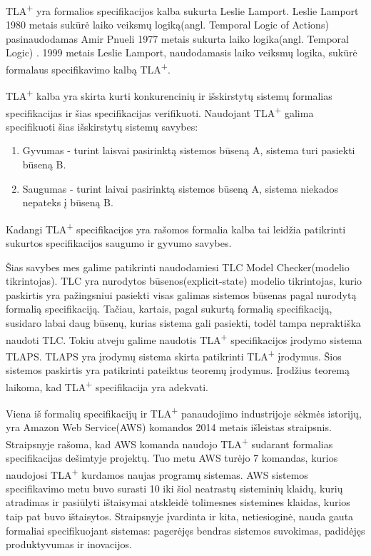 \documentclass{VUMIFPSmagistrinis}
\begin{document}
		TLA\textsuperscript{+} yra formalios specifikacijos kalba sukurta Leslie Lamport\cite{lamport2002specifying}.
		Leslie Lamport 1980 metais sukūrė laiko veiksmų logiką(angl. Temporal Logic of Actions)\cite{10.1145/177492.177726} pasinaudodamas Amir Pnueli 1977 metais sukurta laiko logika(angl. Temporal Logic) \cite{4567924}.
		1999 metais Leslie Lamport, naudodamasis laiko veiksmų logika, sukūrė formalaus specifikavimo kalbą TLA\textsuperscript{+}\cite{lamport2002specifying}.
		

TLA\textsuperscript{+} kalba yra skirta kurti konkurencinių ir išskirstytų sistemų formalias specifikacijas ir šias specifikacijas verifikuoti.
		Naudojant TLA\textsuperscript{+} galima specifikuoti šias išskirstytų sistemų savybes:
		\begin{enumerate}
			\item{Gyvumas - turint laisvai pasirinktą sistemos būseną A, sistema turi pasiekti būseną B.}
			\item{Saugumas - turint laivai pasirinktą sistemos būseną A, sistema niekados nepateks į būseną B.}
		\end{enumerate}
		Kadangi TLA\textsuperscript{+} specifikacijos yra rašomos formalia kalba tai leidžia patikrinti sukurtos specifikacijos saugumo ir gyvumo savybes.
		

	Šias savybes mes galime patikrinti naudodamiesi TLC Model Checker(modelio tikrintojas).
		TLC yra nurodytos būsenos(explicit-state) modelio tikrintojas, kurio paskirtis yra pažingsniui pasiekti visas galimas sistemos būsenas pagal nurodytą formalią specifikaciją.
		Tačiau, kartais, pagal sukurtą formalią specifikaciją, susidaro labai daug būsenų, kurias sistema gali pasiekti, todėl tampa nepraktiška naudoti TLC.
		Tokiu atveju galime naudotis TLA\textsuperscript{+} specifikacijos įrodymo sistema TLAPS.
		TLAPS yra įrodymų sistema skirta patikrinti TLA\textsuperscript{+} įrodymus.
		Šios sistemos paskirtis yra patikrinti pateiktus teoremų įrodymus.
		Įrodžius teoremą laikoma, kad TLA\textsuperscript{+} specifikacija yra adekvati.


		Viena iš formalių specifikacijų ir TLA\textsuperscript{+} panaudojimo industrijoje sėkmės istorijų, yra Amazon Web Service(AWS) komandos 2014 metais išleistas straipsnis\cite{newcombe2014use}.
		Straipsnyje rašoma,  kad AWS komanda naudojo TLA\textsuperscript{+} sudarant formalias specifikacijas dešimtyje projektų. Tuo metu AWS turėjo 7 komandas, kurios naudojosi TLA\textsuperscript{+} kurdamos naujas programų sistemas.
		AWS sistemos specifikavimo metu buvo surasti 10 iki šiol neatrastų sisteminių klaidų, kurių atradimas ir pasiūlyti ištaisymai atskleidė tolimesnes sistemines klaidas, kurios taip pat buvo ištaisytos.
		Straipsnyje įvardinta ir kita, netiesioginė, nauda gauta formaliai specifikuojant sistemas: pagerėjęs bendras sistemos suvokimas, padidėjęs produktyvumas ir inovacijos.
		
\end{document}
